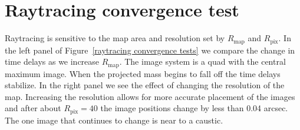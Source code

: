 \documentclass[onecolumn,galley]{mn2e}
\newcommand{\Rmap}{\ensuremath{R_\mathrm{map}}}
\newcommand{\Rpix}{\ensuremath{R_\mathrm{pix}}}
\newcommand{\figref}[1] {Figure~\ref{#1}}
\begin{document}
%
%


\section{Raytracing convergence test}
Raytracing is sensitive to the map area and resolution set by $\Rmap$ and
$\Rpix$.  In the left panel of \figref{raytracing convergence tests} we compare
the change in time delays as we increase $\Rmap$.  The image system is a quad
with the central maximum image. When the projected mass begins to fall off the
time delays stabilize. In the right panel we see the effect of changing the
resolution of the map.  Increasing the resolution allows for more accurate
placement of the images and after about $\Rpix=40$ the image positions change
by less than 0.04 arcsec. The one image that continues to change is near to a
caustic.  
\end{document}
